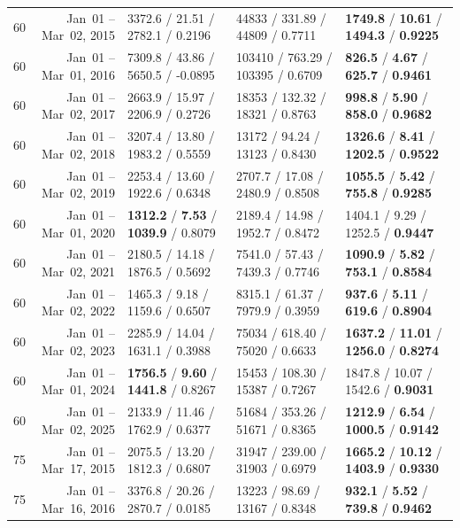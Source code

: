 \begin{longtable}{r r l l l}
60 & Jan~01 -- Mar~02, 2015 & 3372.6 / 21.51 / 2782.1 / 0.2196 & 44833 / 331.89 / 44809 / 0.7711 & \textbf{1749.8} / \textbf{10.61} / \textbf{1494.3} / \textbf{0.9225} \\
60 & Jan~01 -- Mar~01, 2016 & 7309.8 / 43.86 / 5650.5 / -0.0895 & 103410 / 763.29 / 103395 / 0.6709 & \textbf{826.5} / \textbf{4.67} / \textbf{625.7} / \textbf{0.9461} \\
60 & Jan~01 -- Mar~02, 2017 & 2663.9 / 15.97 / 2206.9 / 0.2726 & 18353 / 132.32 / 18321 / 0.8763 & \textbf{998.8} / \textbf{5.90} / \textbf{858.0} / \textbf{0.9682} \\
60 & Jan~01 -- Mar~02, 2018 & 3207.4 / 13.80 / 1983.2 / 0.5559 & 13172 / 94.24 / 13123 / 0.8430 & \textbf{1326.6} / \textbf{8.41} / \textbf{1202.5} / \textbf{0.9522} \\
60 & Jan~01 -- Mar~02, 2019 & 2253.4 / 13.60 / 1922.6 / 0.6348 & 2707.7 / 17.08 / 2480.9 / 0.8508 & \textbf{1055.5} / \textbf{5.42} / \textbf{755.8} / \textbf{0.9285} \\
60 & Jan~01 -- Mar~01, 2020 & \textbf{1312.2} / \textbf{7.53} / \textbf{1039.9} / 0.8079 & 2189.4 / 14.98 / 1952.7 / 0.8472 & 1404.1 / 9.29 / 1252.5 / \textbf{0.9447} \\
60 & Jan~01 -- Mar~02, 2021 & 2180.5 / 14.18 / 1876.5 / 0.5692 & 7541.0 / 57.43 / 7439.3 / 0.7746 & \textbf{1090.9} / \textbf{5.82} / \textbf{753.1} / \textbf{0.8584} \\
60 & Jan~01 -- Mar~02, 2022 & 1465.3 / 9.18 / 1159.6 / 0.6507 & 8315.1 / 61.37 / 7979.9 / 0.3959 & \textbf{937.6} / \textbf{5.11} / \textbf{619.6} / \textbf{0.8904} \\
60 & Jan~01 -- Mar~02, 2023 & 2285.9 / 14.04 / 1631.1 / 0.3988 & 75034 / 618.40 / 75020 / 0.6633 & \textbf{1637.2} / \textbf{11.01} / \textbf{1256.0} / \textbf{0.8274} \\
60 & Jan~01 -- Mar~01, 2024 & \textbf{1756.5} / \textbf{9.60} / \textbf{1441.8} / 0.8267 & 15453 / 108.30 / 15387 / 0.7267 & 1847.8 / 10.07 / 1542.6 / \textbf{0.9031} \\
60 & Jan~01 -- Mar~02, 2025 & 2133.9 / 11.46 / 1762.9 / 0.6377 & 51684 / 353.26 / 51671 / 0.8365 & \textbf{1212.9} / \textbf{6.54} / \textbf{1000.5} / \textbf{0.9142} \\
\midrule
75 & Jan~01 -- Mar~17, 2015 & 2075.5 / 13.20 / 1812.3 / 0.6807 & 31947 / 239.00 / 31903 / 0.6979 & \textbf{1665.2} / \textbf{10.12} / \textbf{1403.9} / \textbf{0.9330} \\
75 & Jan~01 -- Mar~16, 2016 & 3376.8 / 20.26 / 2870.7 / 0.0185 & 13223 / 98.69 / 13167 / 0.8348 & \textbf{932.1} / \textbf{5.52} / \textbf{739.8} / \textbf{0.9462} \\

\end{longtable}
